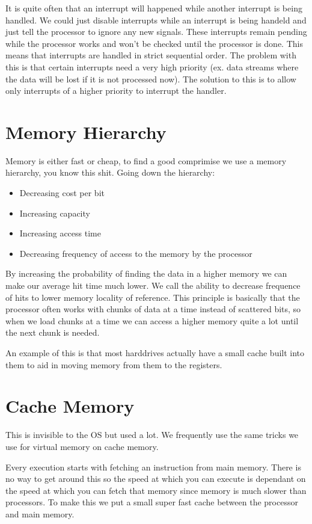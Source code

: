 \documentclass[12pt]{article}
\begin{document}
It is quite often that an interrupt will happened while another interrupt is being handled. We could just disable interrupts while an interrupt is being handeld and just tell the processor to ignore any new signals. These interrupts remain pending while the processor works and won't be checked until the processor is done. This means that interrupts are handled in strict sequential order. The problem with this is that certain interrupts need a very high priority (ex. data streams where the  data will be lost if it is not processed now). The solution to this is to allow only interrupts of a higher priority to interrupt the handler.

\section{Memory Hierarchy}
Memory is either fast or cheap, to find a good comprimise we use a memory hierarchy, you know this shit.
Going down the hierarchy:
\begin{itemize}
  \item Decreasing cost per bit
  \item Increasing capacity
  \item Increasing access time
  \item Decreasing frequency of access to the memory by the processor
\end{itemize}

By increasing the probability of finding the data in a higher memory we can make our average hit time much lower. We call the ability to decrease frequence of hits to lower memory locality of reference. This principle is basically that the processor often works with chunks of data at a time instead of scattered bits, so when we load chunks at a time we can access a higher memory quite a lot until the next chunk is needed.

An example of this is that most harddrives actually have a small cache built into them to aid in moving memory from them to the registers.

\section{Cache Memory}
This is invisible to the OS but used a lot. We frequently use the same tricks we use for virtual memory on cache memory.

Every execution starts with fetching an instruction from main memory. There is no way to get around this so the speed at which you can execute is dependant on the speed at which you can fetch that memory since memory is much slower than processors. To make this we put a small super fast cache between the processor and main memory.
\end{document}
